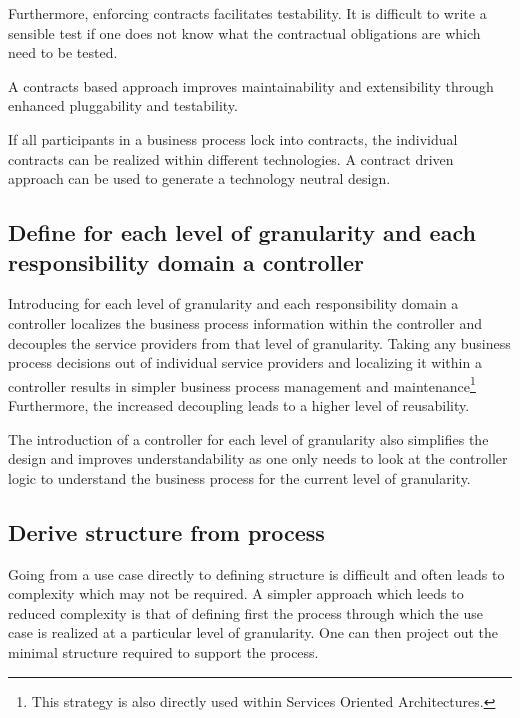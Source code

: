 \documentclass{IOS-Book-Article}
\begin{document}
Furthermore, enforcing contracts facilitates testability. It is difficult to write a sensible test if one does not know 
what the contractual obligations are which need to be tested.

A contracts based approach improves maintainability and extensibility through enhanced pluggability
and testability.

If all participants in a business process lock into contracts, the individual contracts can be realized within different
technologies. A contract driven approach can be used to generate a technology neutral design.


\subsection{Define for each level of granularity and each responsibility domain a controller}

Introducing for each level of granularity and each responsibility domain a controller localizes the business process
information within the controller and decouples the service providers from that level of granularity. Taking any 
business process decisions out of individual service providers and localizing it within a controller results in simpler 
business process management and maintenance\footnote{This strategy is also directly used within Services Oriented Architectures.}
Furthermore, the increased decoupling leads to a higher level of reusability. 

The introduction of a controller for each level of granularity also simplifies the design and improves understandability
as one only needs to look at the controller logic to understand the business process for the current level of granularity.


\subsection{Derive structure from process}

Going from a use case directly to defining structure is difficult and often leads to complexity which may not be required. 
A simpler approach which leeds to reduced complexity is that of defining first the process 
through which the use case is realized at a particular level of granularity. One can then project out
the minimal structure required to support the process.
\end{document}
